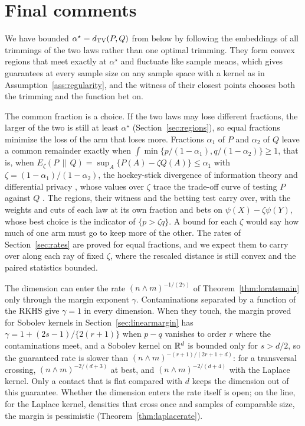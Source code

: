 \section{Final comments}
\label{sec:discussion}

We have bounded $\alpha^\star=d_{\mathrm{TV}}(P,Q)$ from below by following the embeddings of all trimmings of the two laws
rather than one optimal trimming. They form convex regions that meet exactly at $\alpha^\star$ and fluctuate like
sample means, which gives guarantees at every sample size on any sample space with a kernel as in
Assumption~\ref{ass:regularity}, and the witness of their closest points chooses both the trimming and the function
bet on.

The common fraction is a choice. If the two laws may lose different fractions, the larger of the two is still at
least $\alpha^\star$ (Section~\ref{sec:regions}), so equal fractions minimize the loss of the arm that loses more.
Fractions $\alpha_1$ of $P$ and $\alpha_2$ of $Q$ leave a common remainder
exactly when $\int\min\{p/(1-\alpha_1),q/(1-\alpha_2)\}\ge1$, that is, when
$E_\zeta(P\,\|\,Q)=\sup_A\{P(A)-\zeta Q(A)\}\le\alpha_1$ with $\zeta=(1-\alpha_1)/(1-\alpha_2)$, the hockey-stick
divergence of information theory and differential privacy \citep{polyanskiy2010channel}, whose values over $\zeta$
trace the trade-off curve of testing $P$ against $Q$ \citep{dong2022gaussian}. The regions, their witness and the
betting test carry over, with the weights and cuts of each law at its own fraction and bets on
$\psi(X)-\zeta\psi(Y)$, whose best choice is the indicator of $\{p>\zeta q\}$. A bound for each $\zeta$ would say how much of one arm must go to
keep more of the other. The rates of Section~\ref{sec:rates} are proved for equal fractions, and we expect them to carry
over along each ray of fixed $\zeta$, where the rescaled distance is still convex and the paired statistics bounded.

The dimension can enter the rate $(n\wedge m)^{-1/(2\gamma)}$ of Theorem~\ref{thm:loratemain} only through the margin
exponent $\gamma$. Contaminations separated by a function of the RKHS give $\gamma=1$ in every
dimension. When they touch, the margin proved for Sobolev kernels in Section~\ref{sec:linearmargin} has
$\gamma=1+(2s-1)/\{2(r+1)\}$ when $p-q$ vanishes to order $r$ where the contaminations meet, and a Sobolev kernel on
$\mathbb{R}^d$ is bounded only for $s>d/2$, so the guaranteed rate is slower than $(n\wedge m)^{-(r+1)/(2r+1+d)}$: for a
transversal crossing, $(n\wedge m)^{-2/(d+3)}$ at best, and $(n\wedge m)^{-2/(d+4)}$ with the Laplace kernel. Only a
contact that is flat compared with $d$ keeps the dimension out of this guarantee. Whether the dimension enters the rate
itself is open; on the line, for the Laplace kernel, densities that cross once and samples of comparable size, the
margin is pessimistic (Theorem~\ref{thm:laplacerate}).

